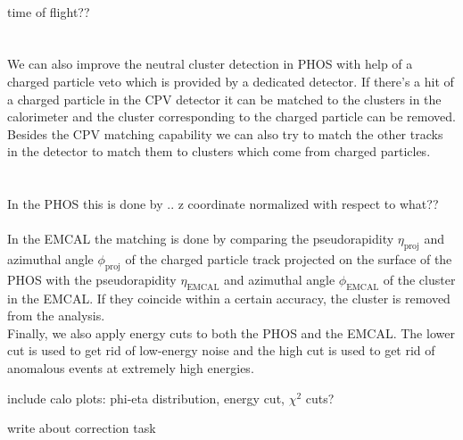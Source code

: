 \\
time of flight?? \\
\\
\\
We can also improve the neutral cluster detection in PHOS with help of a charged particle veto which is provided by a dedicated detector. If there's a hit of a charged particle in the CPV detector it can be matched to the clusters in the calorimeter and the cluster corresponding to the charged particle can be removed. \\
Besides the CPV matching capability we can also try to match the other tracks in the detector to match them to clusters which come from charged particles. \\
\\
\\
In the PHOS this is done by .. z coordinate normalized with respect to what??
\\
\\
In the EMCAL the matching is done by comparing the pseudorapidity $\eta_{\mathrm{proj}}$ and azimuthal angle $\phi_{\mathrm{proj}}$ of the charged particle track projected on the surface of the PHOS with the pseudorapidity $\eta_{\mathrm{EMCAL}}$ and azimuthal angle $\phi_{\mathrm{EMCAL}}$ of the cluster in the EMCAL. If they coincide within a certain accuracy, the cluster is removed from the analysis. \\
Finally, we also apply energy cuts to both the PHOS and the EMCAL. The lower cut is used to get rid of low-energy noise and the high cut is used to get rid of anomalous events at extremely high energies.

include calo plots:
phi-eta distribution, energy cut, $\chi^2$ cuts?

write about correction task


